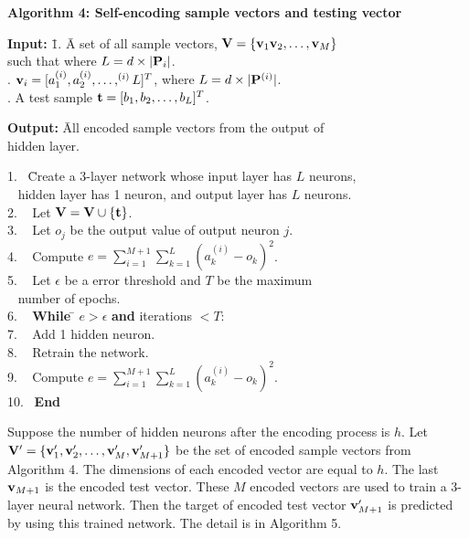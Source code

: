 \documentclass[lettersize,journal]{IEEEtran}
\begin{document}
\vspace{0.2in}
\noindent
{\bf Algorithm 4: Self-encoding sample vectors and testing vector}
\begin{tabbing}
{\bf Input:}  \= 1. \= A set of all sample vectors, ${\bf V} = \{{\bf v}_{1} {\bf v}_{2}, \ldots, {\bf v}_{M}\}$ \\ 
              \>    \> such that where $L = d \times |{\bf P}_{i}|$. \\
              . \> ${\bf v}_{i} = [a^{(i)}_{1}, a^{(i)}_{2}, \ldots, ^{(i)}{L}]^{T}$, where $L = d 
                       \times |{\bf P}^{(i)}|$. \\
              . \> A test sample ${\bf t}= [b_{1}, b_{2}, \ldots, b_{L}]^{T}$.
\end{tabbing}
\begin{tabbing}
{\bf Output:} \= All encoded sample vectors from the output of \\
              \> hidden layer.
\end{tabbing}
\begin{tabbing}
1. ~\= Create a 3-layer network whose input layer has $L$ neurons, \\
   ~\> hidden layer has 1 neuron, and output layer has $L$ neurons. \\
2. ~\> Let ${\bf V} = {\bf V} \cup \{{\bf t}\}$. \\
3. ~\> Let $o_{j}$ be the output value of output neuron $j$. \\
4. ~\> Compute $e = \sum_{i=1}^{M+1} \sum_{k=1}^{L} (a^{(i)}_{k} - o_{k})^{2}$. \\
5. ~\> Let $\epsilon$ be a error threshold and $T$ be the maximum \\
   ~\> number of epochs. \\
6. ~\> {\bf While} \= $e > \epsilon$ {\bf and} iterations $< T$: \\
7. ~\>             \> Add 1 hidden neuron. \\
8. ~\>             \> Retrain the network. \\
9. ~\>             \> Compute $e = \sum_{i=1}^{M+1} \sum_{k=1}^{L} (a^{(i)}_{k} - o_{k})^{2}$. \\
10.~\> {\bf End} 
\end{tabbing}
Suppose the number of hidden neurons after the encoding process is $h$. Let ${\bf V}^{\prime} = 
\{{\bf v}^{\prime}_{1}, {\bf v}^{\prime}_{2}, \ldots, {\bf v}^{\prime}_{M}, {\bf v}^{\prime}_{M+1}\}$ 
be the set of encoded sample vectors from Algorithm 4. The dimensions of each encoded vector are equal 
to $h$. The last ${\bf v}_{M+1}$ is the encoded test vector. These $M$ encoded vectors are used to train 
a 3-layer neural network. Then the target of encoded test vector ${\bf v}^{\prime}_{M+1}$ is predicted 
by using this trained network. The detail is in Algorithm 5. 
\end{document}
